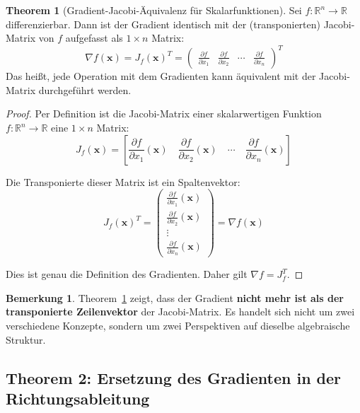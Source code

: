 ﻿\documentclass[a4paper,12pt]{article}
\theoremstyle{definition}
\newtheorem{bemerkung}{Bemerkung}
\newtheorem{theorem}{Theorem}
\begin{document}
\begin{theorem}[Gradient-Jacobi-Äquivalenz für Skalarfunktionen]
	\label{thm:gradient_jacobi}
	Sei $f: \mathbb{R}^n \to \mathbb{R}$ differenzierbar. Dann ist der Gradient identisch mit der (transponierten) Jacobi-Matrix von $f$ aufgefasst als $1 \times n$ Matrix:
	\[
	\nabla f(\boldsymbol{x}) = J_f(\boldsymbol{x})^T = \begin{pmatrix}
		\frac{\partial f}{\partial x_1} & \frac{\partial f}{\partial x_2} & \cdots & \frac{\partial f}{\partial x_n}
	\end{pmatrix}^T
	\]
	Das heißt, jede Operation mit dem Gradienten kann äquivalent mit der Jacobi-Matrix durchgeführt werden.
\end{theorem}

\begin{proof}
	Per Definition ist die Jacobi-Matrix einer skalarwertigen Funktion $f: \mathbb{R}^n \to \mathbb{R}$ eine $1 \times n$ Matrix:
	\[
	J_f(\boldsymbol{x}) = \left[ \frac{\partial f}{\partial x_1}(\boldsymbol{x}) \quad \frac{\partial f}{\partial x_2}(\boldsymbol{x}) \quad \cdots \quad \frac{\partial f}{\partial x_n}(\boldsymbol{x}) \right]
	\]
	
	Die Transponierte dieser Matrix ist ein Spaltenvektor:
	\[
	J_f(\boldsymbol{x})^T = \begin{pmatrix}
		\frac{\partial f}{\partial x_1}(\boldsymbol{x}) \\
		\frac{\partial f}{\partial x_2}(\boldsymbol{x}) \\
		\vdots \\
		\frac{\partial f}{\partial x_n}(\boldsymbol{x})
	\end{pmatrix} = \nabla f(\boldsymbol{x})
	\]
	
	Dies ist genau die Definition des Gradienten. Daher gilt $\nabla f = J_f^T$.
\end{proof}

\begin{bemerkung}
	Theorem~\ref{thm:gradient_jacobi} zeigt, dass der Gradient \textbf{nicht mehr ist als der transponierte Zeilenvektor} der Jacobi-Matrix. Es handelt sich nicht um zwei verschiedene Konzepte, sondern um zwei Perspektiven auf dieselbe algebraische Struktur.
\end{bemerkung}

\subsection{Theorem 2: Ersetzung des Gradienten in der Richtungsableitung}
\end{document}
